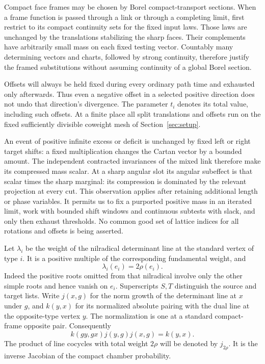 Compact face frames may be chosen by Borel compact-transport sections.
When a frame function is passed through a link or through a completing
limit, first restrict to its compact continuity sets for the fixed input
laws.  Those laws are unchanged by the translations stabilizing the sharp
faces.  Their complements have arbitrarily small mass on each fixed
testing vector.  Countably many determining vectors and charts, followed
by strong continuity, therefore justify the framed substitutions without
assuming continuity of a global Borel section.

Offsets will always be held fixed during every ordinary path time and
exhausted only afterwards.  Thus even a negative offset in a selected
positive direction does not undo that direction's divergence.  The parameter
$t_i$ denotes its total value, including such offsets.  At a finite place
all split translations and offsets run on the fixed sufficiently divisible
coweight mesh of Section~\ref{sec:setup}.



An event of positive infinite excess or deficit is unchanged by fixed left
or right target shifts: a fixed multiplication changes the Cartan vector
by a bounded amount.  The independent contracted invariances of the mixed
link therefore make its compressed mass scalar.  At a sharp angular slot
its angular subeffect is that scalar times the sharp marginal: its
compression is dominated by the relevant projection at every cut.  This
observation applies after retaining additional length or phase variables.
It permits us to fix a purported positive mass in an iterated limit, work
with bounded shift windows and continuous subtests with slack, and only
then exhaust thresholds.  No common good set of lattice indices for all
rotations and offsets is being asserted.

Let $\lambda_i$ be the weight of the nilradical determinant line at the
standard vertex of type $i$.  It is a positive multiple of the corresponding
fundamental weight, and
\[
 \lambda_i(e_i)=2\rho(e_i).
\]
Indeed the positive roots omitted from that nilradical involve only the
other simple roots and hence vanish on $e_i$.  Superscripts $S,T$ distinguish
the source and target lists.  Write $j(x,g)$ for the norm growth of the
determinant line at $x$ under $g$, and $k(y,x)$ for its normalized absolute
pairing with the dual line at the opposite-type vertex $y$.  The normalization
is one at a standard compact-frame opposite pair.  Consequently
\[
 k(gy,gx)j(y,g)j(x,g)=k(y,x).
\]
The product of line cocycles with total weight $2\rho$ will be denoted by
$j_{2\rho}$.  It is the inverse Jacobian of the compact chamber probability.

